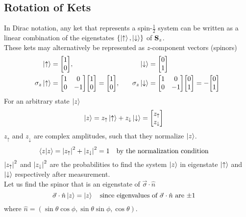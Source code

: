 \documentclass[12pt,a4paper,titlepage]{article}
\newcommand{\up}{\uparrow} %
\newcommand{\dn}{\downarrow} %
\begin{document}
\subsection{Rotation of Kets}
In Dirac notation, any ket that represents a spin-$\frac{1}{2}$ system can be written as a linear combination of the eigenstates $\{\ket{\up},\ket{\dn}\}$ of $\vb{S}_{z}$.\\

These kets may alternatively be represented as $z$-component vectors (spinors)
\begin{equation}
\begin{aligned}
\ket{\up}&=\mqty[1 \\ 0],\quad &\ket{\dn}&=\mqty[0\\1]\\
\sigma_{z}\ket{\up}&=\mqty[1 & 0\\0 & -1]\mqty[1\\0]=\mqty[1\\0],\quad &\sigma_{z}\ket{\dn}&=\mqty[1 & 0\\0 & -1]\mqty[0\\1]=-\mqty[0\\1]
\end{aligned}
\end{equation}
For an arbitrary state $\ket{z}$
\begin{equation}
\begin{aligned}
\ket{z}&=z_{\up}\ket{\up}+z_{\dn}\ket{\dn}=\mqty[z_{\up}\\z_{\dn}]
\end{aligned}
\end{equation}
$z_{\up}$ and $z_{\dn}$ are complex amplitudes, such that they normalize $\ket{z}$.
\begin{equation}
\ip{z}=\abs{z_{\up}}^{2}+\abs{z_{\dn}}^{2}=1\qq{by the normalization condition}
\end{equation}
$\abs{z_{\up}}^{2}$ and $\abs{z_{\dn}}^{2}$ are the probabilities to find the system $\ket{z}$ in eigenstate $\ket{\up}$ and $\ket{\dn}$ respectively after measurement.\\

Let us find the spinor that is an eigenstate of $\vec{\sigma}\cdot\hat{n}$
\begin{equation}
\vec{\sigma}\cdot\hat{n}\ket{z}=\ket{z}\qq{since eigenvalues of $\vec{\sigma}\cdot\hat{n}$ are $\pm1$}
\end{equation}
where $\hat{n}=(\sin\theta\cos\phi,\sin\theta\sin\phi,\cos\theta)$.\\
\end{document}
